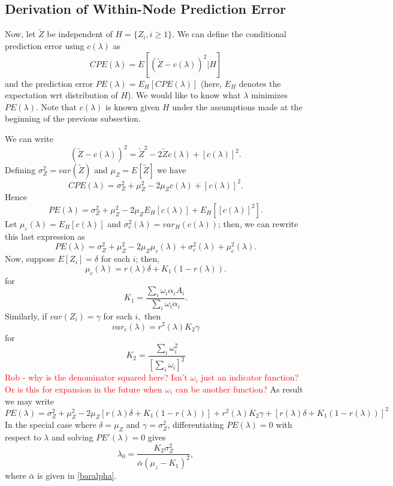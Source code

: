 \documentclass[12pt]{article}
\begin{document}
\subsection{Derivation of Within-Node Prediction Error}
\label{PE}
Now, let $\tilde{Z}$ be independent of $H = \{Z_i, i \geq 1\}.$ We can
define the conditional prediction error using $c(\lambda)$ as
\[
CPE(\lambda) = E\left[ (\tilde Z - c(\lambda))^2 | H \right]
\] 
and the prediction error $PE(\lambda) = E_H\left[ CPE(\lambda)
  \right]$ (here, $E_H$ denotes the expectation wrt distribution of
$H$).  We would like to know what $\lambda$ minimizes
$PE(\lambda)$. Note that $c(\lambda)$ is known given $H$ under the
assumptions made at the beginning of the previous subsection.

We can write
\[
(\tilde Z - c(\lambda))^2 = \tilde Z^2 - 2 \tilde Z c(\lambda) + [c(\lambda)]^2.
\]
Defining $\sigma^2_Z = var(\tilde Z)$ and $\mu_Z = E[\tilde Z]$ we have
\[
CPE(\lambda) = \sigma^2_Z + \mu^2_Z - 2 \mu_Z c(\lambda) + [c(\lambda)]^2.
\]
Hence
\[
PE(\lambda) = \sigma^2_Z + \mu^2_Z - 2 \mu_Z E_H[c(\lambda)] + E_H[[c(\lambda)]^2].
\]
Let $\mu_c(\lambda) = E_H[c(\lambda)] $ and $\sigma^2_c(\lambda) =
var_H(c(\lambda))$; then, we can rewrite this last expression as
\[
PE(\lambda) = \sigma^2_Z + \mu^2_Z - 2 \mu_Z \mu_c(\lambda) + \sigma^2_c(\lambda) + \mu^2_c(\lambda).
\]
Now, suppose $E[Z_i] = \delta$ for each $i$; then,
\[
\mu_c(\lambda) = r(\lambda) \delta+ K_1 (1-r(\lambda)).
\]
for
\[
K_1 =  \frac{ \sum_i \omega_i \alpha_i A_i}{ \sum_i \omega_i \alpha_i }.
\]
Similarly, if $var(Z_i) = \gamma$ for each $i,$ then
\[
var_c(\lambda) = r^2(\lambda) K_2 \gamma
\]
for 
\[
K_2 = \frac{ \sum_i \omega_i^2 }{[ \sum_i \omega_i]^2}
\] \textcolor{red}{Rob - why is the denominator squared here? Isn't $\omega_i$ just an indicator function? Or is this for expansion in the future when $\omega_i$ can be another function?}
As result we may write
\[
PE(\lambda) = \sigma^2_Z + \mu^2_Z - 2 \mu_Z [r(\lambda) \delta + K_1 (1-r(\lambda)) ] + 
r^2(\lambda) K_2 \gamma + 
[r(\lambda) \delta + K_1 (1-r(\lambda))]^2
\]
In the special case where $\delta = \mu_Z$ and $\gamma = \sigma^2_Z$,
differentiating $PE(\lambda) = 0$ with respect to $\lambda$ and
solving $PE'(\lambda) = 0$ gives
\begin{equation}
\label{lam-opt1}
\lambda_0 = \frac{K_2 \sigma^2_Z}{ \bar{\alpha} (\mu_z - K_1)^2},
\end{equation}
where $\bar \alpha$ is given in \eqref{baralpha}.
\end{document}
